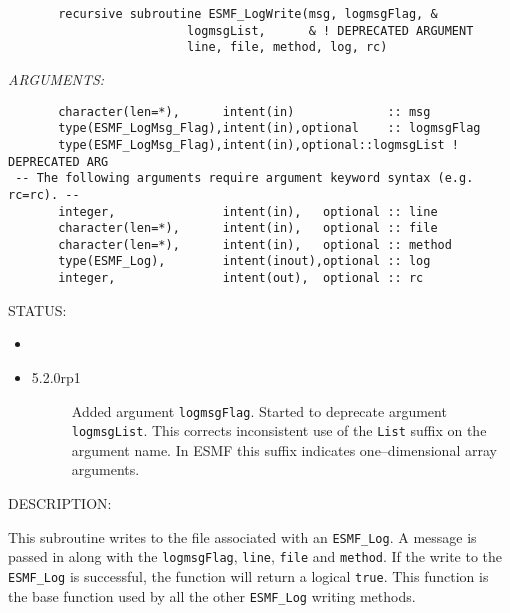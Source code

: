  
\begin{verbatim}       recursive subroutine ESMF_LogWrite(msg, logmsgFlag, &
                         logmsgList,      & ! DEPRECATED ARGUMENT
                         line, file, method, log, rc)\end{verbatim}{\em ARGUMENTS:}
\begin{verbatim}       character(len=*),      intent(in)             :: msg
       type(ESMF_LogMsg_Flag),intent(in),optional    :: logmsgFlag
       type(ESMF_LogMsg_Flag),intent(in),optional::logmsgList ! DEPRECATED ARG
 -- The following arguments require argument keyword syntax (e.g. rc=rc). --
       integer,               intent(in),   optional :: line
       character(len=*),      intent(in),   optional :: file
       character(len=*),      intent(in),   optional :: method
       type(ESMF_Log),        intent(inout),optional :: log
       integer,               intent(out),  optional :: rc
 \end{verbatim}
{\sf STATUS:}
   \begin{itemize}
   \item{}
   \item{}
   \begin{description}
   \item[5.2.0rp1] Added argument {\tt logmsgFlag}.
                   Started to deprecate argument {\tt logmsgList}.
                   This corrects inconsistent use of the {\tt List} suffix on
                   the argument name. In ESMF this suffix indicates
                   one--dimensional array arguments.
   \end{description}
   \end{itemize}
  
{\sf DESCRIPTION:\\ }


        This subroutine writes to the file associated with an {\tt ESMF\_Log}.
        A message is passed in along with the {\tt logmsgFlag}, {\tt line},
        {\tt file} and {\tt method}.  If the write to the {\tt ESMF\_Log}
        is successful, the function will return a logical {\tt true}.  This
        function is the base function used by all the other {\tt ESMF\_Log}
        writing methods.
  
